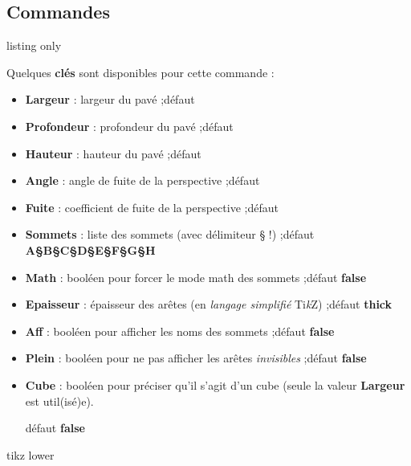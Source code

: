 \documentclass[a4paper,french,11pt]{article}
\providecommand\tikzlogo{Ti\textit{k}Z}
\let\TikZ\tikzlogo
\newcommand\Cle[1]{{\bfseries\sffamily\textlangle #1\textrangle}}
\begin{document}
\subsection{Commandes}

\begin{PresCodeTexPL}{listing only}
\end{PresCodeTexPL}

\begin{cautionblock}
Quelques \Cle{clés} sont disponibles pour cette commande :

\begin{itemize}
	\item \Cle{Largeur} : largeur du pavé ;\hfill{}défaut \Cle{2}
	\item \Cle{Profondeur} : profondeur du pavé ;\hfill{}défaut \Cle{1}
	\item \Cle{Hauteur} : hauteur du pavé ;\hfill{}défaut \Cle{1.25}
	\item \Cle{Angle} : angle de fuite de la perspective ;\hfill{}défaut \Cle{30}
	\item \Cle{Fuite} : coefficient de fuite de la perspective ;\hfill{}défaut \Cle{0.5}
	\item \Cle{Sommets} : liste des sommets (avec délimiteur § !) ;\hfill{}défaut \Cle{A§B§C§D§E§F§G§H}
	\item \Cle{Math} : booléen pour forcer le mode math des sommets ;\hfill{}défaut \Cle{false}
	\item \Cle{Epaisseur} : épaisseur des arêtes (en \textit{langage simplifié} \TikZ) ;\hfill{}défaut \Cle{thick}
	\item \Cle{Aff} : booléen pour afficher les noms des sommets ;\hfill{}défaut \Cle{false}
	\item \Cle{Plein} : booléen pour ne pas afficher les arêtes \textit{invisibles} ;\hfill{}défaut \Cle{false}
	\item \Cle{Cube} : booléen pour préciser qu'il s'agit d'un cube (seule la valeur \Cle{Largeur} est util(isé)e).
	
	\hfill{}défaut \Cle{false}
\end{itemize}
\vspace*{-\baselineskip}\leavevmode
\end{cautionblock}

\begin{PresCodePL}{tikz lower}
\PaveTikz
\end{PresCodePL}
\end{document}
